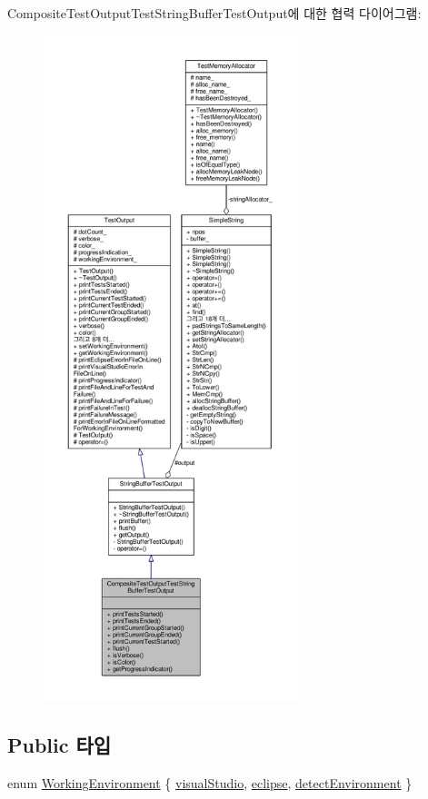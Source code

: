 Composite\+Test\+Output\+Test\+String\+Buffer\+Test\+Output에 대한 협력 다이어그램\+:
\nopagebreak
\begin{figure}[H]
\begin{center}
\leavevmode
\includegraphics[height=550pt]{class_composite_test_output_test_string_buffer_test_output__coll__graph}
\end{center}
\end{figure}
\subsection*{Public 타입}
\begin{DoxyCompactItemize}
\item 
enum \hyperlink{class_test_output_a0541851f863713454486a9fb3080f766}{Working\+Environment} \{ \hyperlink{class_test_output_a0541851f863713454486a9fb3080f766a47f3a5b9ed4237588024b983a4ca8399}{visual\+Studio}, 
\hyperlink{class_test_output_a0541851f863713454486a9fb3080f766abf6505364f680c2682d5648cd0c76f53}{eclipse}, 
\hyperlink{class_test_output_a0541851f863713454486a9fb3080f766a3f11f791db94db142e33c3c75442ed10}{detect\+Environment}
 \}
\end{DoxyCompactItemize}
